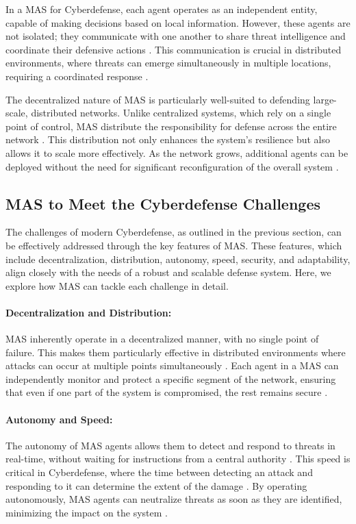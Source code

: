 In a MAS for Cyberdefense, each agent operates as an independent entity, capable of making decisions based on local information. However, these agents are not isolated; they communicate with one another to share threat intelligence and coordinate their defensive actions \cite{kolias2011swarm}. This communication is crucial in distributed environments, where threats can emerge simultaneously in multiple locations, requiring a coordinated response \cite{bace2001intrusion}.

The decentralized nature of MAS is particularly well-suited to defending large-scale, distributed networks. Unlike centralized systems, which rely on a single point of control, MAS distribute the responsibility for defense across the entire network \cite{shamshirband2014cooperative}. This distribution not only enhances the system's resilience but also allows it to scale more effectively. As the network grows, additional agents can be deployed without the need for significant reconfiguration of the overall system \cite{shamshirband2018computational}.

\subsection{MAS to Meet the Cyberdefense Challenges}

The challenges of modern Cyberdefense, as outlined in the previous section, can be effectively addressed through the key features of MAS. These features, which include decentralization, distribution, autonomy, speed, security, and adaptability, align closely with the needs of a robust and scalable defense system. Here, we explore how MAS can tackle each challenge in detail.

\paragraph{Decentralization and Distribution:}
MAS inherently operate in a decentralized manner, with no single point of failure. This makes them particularly effective in distributed environments where attacks can occur at multiple points simultaneously \cite{kolias2011swarm}. Each agent in a MAS can independently monitor and protect a specific segment of the network, ensuring that even if one part of the system is compromised, the rest remains secure \cite{shakarian2015cyber}.

\paragraph{Autonomy and Speed:}
The autonomy of MAS agents allows them to detect and respond to threats in real-time, without waiting for instructions from a central authority \cite{shamshirband2014cooperative}. This speed is critical in Cyberdefense, where the time between detecting an attack and responding to it can determine the extent of the damage \cite{liao2013intrusion}. By operating autonomously, MAS agents can neutralize threats as soon as they are identified, minimizing the impact on the system \cite{shamshirband2018computational}.

